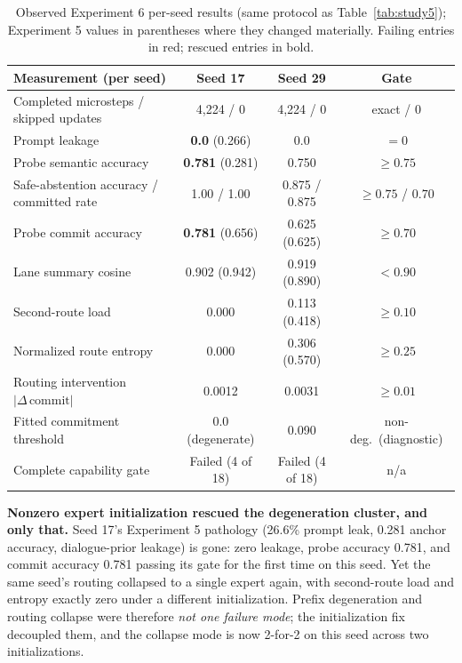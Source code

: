 \documentclass[10pt,a4paper]{article}
\newcommand{\fail}[1]{\textcolor{failred}{#1}}
\begin{document}
\begin{table}[htbp]
\caption{Observed Experiment 6 per-seed results (same protocol as
Table~\ref{tab:study5}); Experiment 5 values in parentheses where they changed
materially. Failing entries in red; rescued entries in bold.}
\label{tab:study6}
\centering\small
\begin{tabularx}{\textwidth}{@{}Xccc@{}}
\toprule
\textbf{Measurement (per seed)} & \textbf{Seed 17} & \textbf{Seed 29} & \textbf{Gate} \\
\midrule
Completed microsteps / skipped updates & 4{,}224 / 0 & 4{,}224 / 0 & exact / 0 \\
Prompt leakage & \textbf{0.0} (0.266) & 0.0 & $= 0$ \\
Probe semantic accuracy & \textbf{0.781} (0.281) & 0.750 & $\ge 0.75$ \\
Safe-abstention accuracy / committed rate & 1.00 / 1.00 & 0.875 / 0.875 & $\ge 0.75$ / $0.70$ \\
Probe commit accuracy & \textbf{0.781} (0.656) & \fail{0.625} (0.625) & $\ge 0.70$ \\
Lane summary cosine & \fail{0.902} (0.942) & \fail{0.919} (0.890) & $< 0.90$ \\
Second-route load & \fail{0.000} & 0.113 (0.418) & $\ge 0.10$ \\
Normalized route entropy & \fail{0.000} & 0.306 (0.570) & $\ge 0.25$ \\
Routing intervention $|\Delta\,\mathrm{commit}|$ & \fail{0.0012} & \fail{0.0031} & $\ge 0.01$ \\
Fitted commitment threshold & \fail{0.0 (degenerate)} & 0.090 & non-deg.\ (diagnostic) \\
Complete capability gate & \fail{Failed (4 of 18)} & \fail{Failed (4 of 18)} & n/a \\
\bottomrule
\end{tabularx}
\end{table}

\textbf{Nonzero expert initialization rescued the degeneration cluster, and
only that.} Seed 17's Experiment 5 pathology (26.6\% prompt leak, 0.281 anchor
accuracy, dialogue-prior leakage) is gone: zero leakage, probe accuracy
0.781, and commit accuracy 0.781 passing its gate for the first time on this
seed. Yet the same seed's routing collapsed to a single expert again, with
second-route load and entropy exactly zero under a different initialization.
Prefix degeneration and routing collapse were therefore \emph{not one failure
mode}; the initialization fix decoupled them, and the collapse mode is now
2-for-2 on this seed across two initializations.
\end{document}
